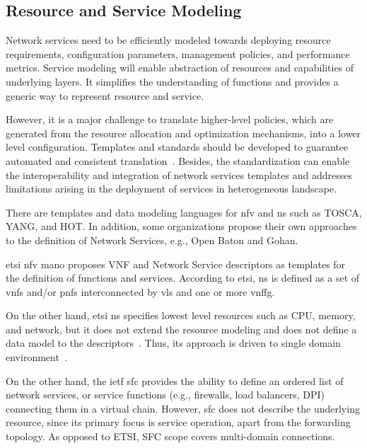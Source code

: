 \subsection{Resource and Service Modeling}

Network services need to be efficiently modeled towards deploying resource requirements, configuration parameters, management policies, and performance metrics. Service modeling will enable abstraction of resources and capabilities of underlying layers. It simplifies the understanding of functions and provides a generic way to represent resource and service. 

However, it is a major challenge to translate higher-level policies, which are generated from the resource allocation and optimization mechanisms, into a lower level configuration. Templates and standards should be developed to guarantee automated and consistent translation~\cite{YongLi2015Software-DefinedSurvey}. Besides, the standardization can enable the interoperability and integration of network services templates and addresses limitations arising in the deployment of services in heterogeneous landscape.

There are templates and data modeling languages for \acrfull{nfv} and \acrfull{ns} such as TOSCA, YANG, and HOT. In addition, some organizations propose their own approaches to the definition of Network Services, e.g., Open Baton and Gohan.

\gls{etsi} \gls{nfv} \gls{mano} proposes VNF and Network Service descriptors as templates for the definition of functions and services. According to \gls{etsi}, \gls{ns} is defined as a set of \glspl{vnf} and/or \glspl{pnf} interconnected by \glspl{vl} and one or more \acrlong{vnffg}. 

On the other hand, \gls{etsi} \gls{ns} specifies lowest level resources such as CPU, memory, and network, but it does not extend the resource modeling and does not define a data model to the descriptors~\cite{Mijumbi2016ManagementVirtualizationb}. Thus, its approach is driven to single domain environment~\cite{Garay2016ServiceForward}. 

On the other hand, the \gls{ietf} \gls{sfc} provides the ability to define an ordered list of network services, or service functions (e.g., firewalls, load balancers, DPI) connecting them in a virtual chain. However, \gls{sfc} does not describe the underlying resource, since its primary focus is service operation, apart from the forwarding topology. As opposed to ETSI, SFC scope covers multi-domain connections.   

